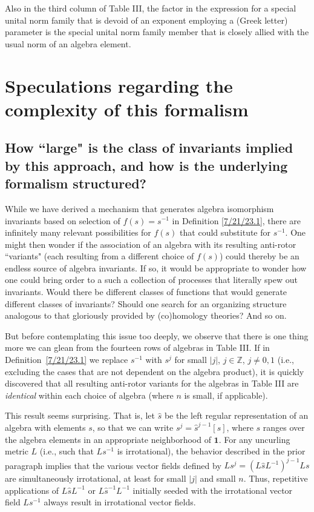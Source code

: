 \documentclass{amsart}
\theoremstyle{definition}
\numberwithin{theorem}{section}
\numberwithin{equation}{section}
\begin{document}
Also in the third column of Table III, the factor in the expression for a special unital norm family that is devoid of an exponent employing a (Greek letter) parameter is the special unital norm family member that is closely allied with the usual norm of an algebra element.



 
   

\section{Speculations regarding the complexity of this formalism}

\subsection{How ``large" is the class of invariants implied by this approach, and how is the underlying formalism structured?}
While we have derived a mechanism that generates algebra isomorphism invariants based on selection of $f(s)=s^{-1}$ in Definition  
\ref{7/21/23.1}, there are infinitely many relevant possibilities for $f(s)$ that could substitute for $s^{-1}$.    One might then wonder if the association of an algebra with its resulting anti-rotor ``variants" (each resulting from a different choice of $f(s)$) could thereby be an endless source of algebra invariants.  If so, it would be appropriate to wonder how one could bring order to a such a collection of processes that literally spew out invariants.  Would there be different classes of functions that would generate different classes of invariants?  Should one search for an organizing structure analogous to that gloriously provided by (co)homology theories?  And so on.  

But before contemplating this issue too deeply, we observe that
there is one thing more we can glean from the fourteen rows of algebras in Table III.  If in \mbox{Definition \ref{7/21/23.1}} we replace $s^{-1}$ with $s^j$ for small $|j|$, $j\in\mathbb{Z}$, $j\ne 0,1$ (i.e., excluding the cases that are not dependent on the algebra product), it is quickly discovered that all resulting anti-rotor variants for the algebras in Table III are {\it identical} within each choice of algebra (where $n$ is small, if applicable).  

This result seems surprising.  That is, let $\hat{s}$ be the left regular representation of an algebra with elements $s$, so that we can write $s^j = \hat{s}^{j-1}[s]$, where $s$ ranges over the algebra elements in an appropriate neighborhood of $\mathbf{1}$. For any uncurling metric $L$ (i.e., such that $Ls^{-1}$ is irrotational), the behavior described in the prior paragraph implies that the various vector fields defined by $Ls^j = (L\hat{s}L^{-1})^{j-1}Ls$ are simultaneously irrotational, at least for small $|j|$ and small $n$. Thus, repetitive applications of $L\hat{s}L^{-1}$ or $L\hat{s}^{-1}L^{-1}$ initially seeded with the irrotational vector field $Ls^{-1}$ always result in irrotational vector fields.  
\end{document}
